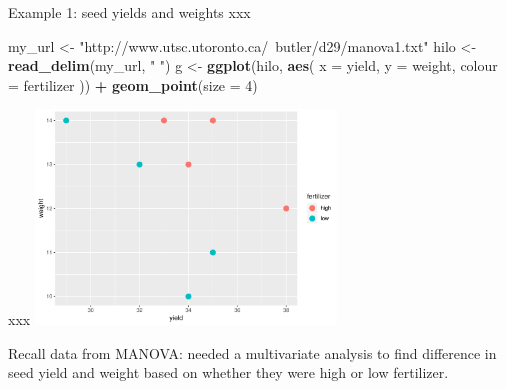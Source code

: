 \documentclass[ignorenonframetext,]{beamer}
\newenvironment{Shaded}{\begin{snugshade}}{\end{snugshade}}
\newcommand{\DataTypeTok}[1]{\textcolor[rgb]{0.13,0.29,0.53}{#1}}
\newcommand{\DecValTok}[1]{\textcolor[rgb]{0.00,0.00,0.81}{#1}}
\newcommand{\KeywordTok}[1]{\textcolor[rgb]{0.13,0.29,0.53}{\textbf{#1}}}
\newcommand{\NormalTok}[1]{#1}
\newcommand{\OperatorTok}[1]{\textcolor[rgb]{0.81,0.36,0.00}{\textbf{#1}}}
\newcommand{\StringTok}[1]{\textcolor[rgb]{0.31,0.60,0.02}{#1}}
\begin{document}
\begin{frame}[fragile]{Example 1: seed yields and weights xxx}
\protect\hypertarget{example-1-seed-yields-and-weights-xxx}{}

\small

\begin{Shaded}
\begin{Highlighting}[]
\NormalTok{my_url <-}\StringTok{ "http://www.utsc.utoronto.ca/~butler/d29/manova1.txt"}
\NormalTok{hilo <-}\StringTok{ }\KeywordTok{read_delim}\NormalTok{(my_url, }\StringTok{" "}\NormalTok{)}
\NormalTok{g <-}\StringTok{ }\KeywordTok{ggplot}\NormalTok{(hilo, }\KeywordTok{aes}\NormalTok{(}
  \DataTypeTok{x =}\NormalTok{ yield, }\DataTypeTok{y =}\NormalTok{ weight,}
  \DataTypeTok{colour =}\NormalTok{ fertilizer}
\NormalTok{)) }\OperatorTok{+}\StringTok{ }\KeywordTok{geom_point}\NormalTok{(}\DataTypeTok{size =} \DecValTok{4}\NormalTok{)}
\end{Highlighting}
\end{Shaded}

\normalsize

\begin{minipage}[t]{0.6\linewidth}
xxx
\includegraphics[width=0.6\textwidth]{berzani}
   
\end{minipage}
\begin{minipage}[t]{0.38\linewidth}
\vspace{0.1\textheight}
Recall data from MANOVA: needed a multivariate analysis to find
difference in seed yield and weight based on whether they were high
or low fertilizer.
\end{minipage}

\end{frame}
\end{document}
